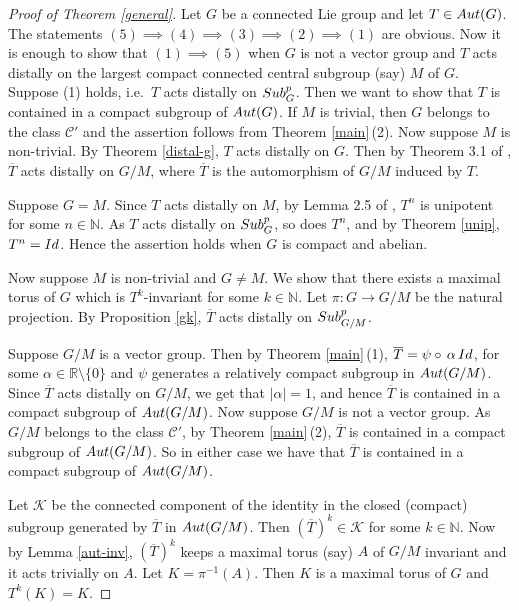 \documentclass{amsart}
\numberwithin{equation}{section}
\newcommand{\Aut}{{\rm Aut}}
\newcommand{\N}{{\mathbb N}}
\newcommand{\R}{{\mathbb R}}
\newcommand{\K}{{\mathcal K}}
\newcommand{\spg}{{\rm Sub}^p_G}
\newcommand{\spp}{{\rm Sub}^{p}}
\newcommand{\Id}{{\rm Id}}
\let\ol=\overline
\let\ap=\alpha
\theoremstyle{remark}
\newcommand{\cp}{{\mathcal{C}'}}
\begin{document}
\begin{proof}[Proof of Theorem \ref{general}] Let $G$ be a connected Lie group and let $T\in\Aut(G)$. 
The statements $(5)\implies (4)\implies (3)\implies (2)\implies (1)$ are obvious. 
Now it is enough to show that $(1)\implies (5)$ when $G$ is not a vector group and 
$T$ acts distally on the largest compact connected central subgroup (say) $M$ of $G$.
Suppose (1) holds, i.e.\ $T$ acts distally on $\spg$. Then we want to show that $T$ is contained 
in a compact subgroup of $\Aut(G)$. If $M$ is trivial, then $G$ belongs to the class $\cp$ and the 
assertion follows from Theorem \ref{main}\,(2). Now suppose $M$ is non-trivial. By Theorem \ref{distal-g}, 
$T$ acts distally on $G$. Then by Theorem 3.1 of \cite{RS1}, $\ol{T}$ acts distally on $G/M$, where 
$\ol{T}$ is the automorphism of $G/M$ induced by $T$. 

Suppose $G=M$. Since $T$ acts distally on $M$, by Lemma 2.5 of \cite{Ab2}, 
$T^n$ is unipotent for some $n\in\N$. As $T$ acts distally on $\spg$, so does $T^n$, 
and by Theorem \ref{unip}, $T^n=\Id$. Hence the assertion holds when $G$ is compact and abelian. 

Now suppose $M$ is non-trivial and $G\ne M$. We show that there exists a maximal torus of $G$ 
which is $T^k$-invariant for some $k\in\N$. Let $\pi:G\to G/M$ be the natural projection. 
By Proposition \ref{gk}, $\ol{T}$ acts distally on $\spp_{G/M}$. 

Suppose $G/M$ is a vector group. Then by Theorem \ref{main}\,(1), 
$\ol{T}=\psi\circ\,\alpha\,\Id$, for some $\ap\in\R\setminus\{0\}$ and $\psi$ 
generates a relatively compact subgroup in $\Aut(G/M)$. Since $\ol{T}$ acts distally on $G/M$, 
we get that $|\alpha|=1$, and hence $\ol{T}$ is contained in a compact subgroup of $\Aut(G/M)$. 
Now suppose $G/M$ is not a vector group. As $G/M$ belongs to the class $\cp$, by Theorem \ref{main}\,(2), 
$\ol{T}$ is contained in a compact subgroup of $\Aut(G/M)$. So in either case we have that $\ol{T}$ is contained 
in a compact subgroup of $\Aut(G/M)$.  

Let $\K$ be the connected component of the identity in the closed (compact) subgroup generated by 
$\ol{T}$ in $\Aut(G/M)$. Then $(\ol{T})^k\in \K$ for some $k\in\N$. 
Now by Lemma \ref{aut-inv}, $(\ol{T})^k$ keeps a maximal torus (say) $A$ of $G/M$ invariant and 
it acts trivially on $A$. Let $K=\pi^{-1}(A)$. Then $K$ is a maximal torus of $G$ and $T^k(K)=K$. 


\end{proof}
\end{document}
